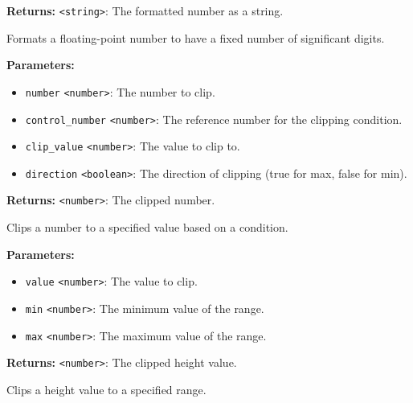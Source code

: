 \documentclass[12pt,a4paper]{article}
\begin{document}
\noindent \textbf{Returns:} \texttt{<string>}: The formatted number as a string.

\noindent Formats a floating-point number to have a fixed number of significant digits.

\vspace{5mm}
\noindent {}


\noindent \textbf{Parameters:}
\begin{itemize}
  \item \texttt{number} \texttt{<number>}: The number to clip.
  \item \texttt{control\_number} \texttt{<number>}: The reference number for the clipping condition.
  \item \texttt{clip\_value} \texttt{<number>}: The value to clip to.
  \item \texttt{direction} \texttt{<boolean>}: The direction of clipping (true for max, false for min).
\end{itemize}

\noindent \textbf{Returns:} \texttt{<number>}: The clipped number.

\noindent Clips a number to a specified value based on a condition.

\vspace{5mm}
\noindent {}


\noindent \textbf{Parameters:}
\begin{itemize}
  \item \texttt{value} \texttt{<number>}: The value to clip.
  \item \texttt{min} \texttt{<number>}: The minimum value of the range.
  \item \texttt{max} \texttt{<number>}: The maximum value of the range.
\end{itemize}

\noindent \textbf{Returns:} \texttt{<number>}: The clipped height value.

\noindent Clips a height value to a specified range.

\vspace{5mm}
\noindent {}
\end{document}

